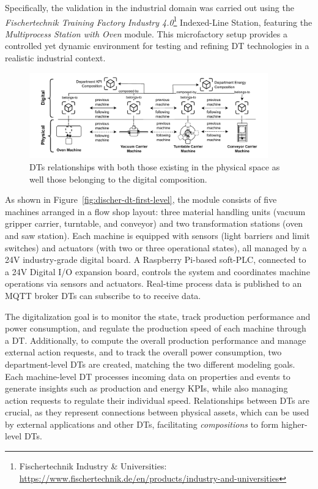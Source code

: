 Specifically, the validation in the industrial domain was carried out using the \emph{Fischertechnik Training Factory Industry 4.0}\footnote{Fischertechnik Industry \& Universities: \url{https://www.fischertechnik.de/en/products/industry-and-universities}} Indexed-Line Station, featuring the \emph{Multiprocess Station with Oven} module.
This microfactory setup provides a controlled yet dynamic environment for testing and refining DT technologies in a realistic industrial context.

\begin{figure}
    \setlength{\belowcaptionskip}{-13pt}
    \centering
    \includegraphics[width=0.92\textwidth]{figures/engineering-wldt/Fischer-relationships.pdf}
    \caption{DTs relationships with both those existing in the physical space as well those belonging to the digital composition.}
    \label{fig:dt-assets-relationships-overview}
\end{figure}

As shown in Figure~\ref{fig:discher-dt-first-level}, the module consists of five machines arranged in a flow shop layout: three material handling units (vacuum gripper carrier, turntable, and conveyor) and two transformation stations (oven and saw station).
Each machine is equipped with sensors (light barriers and limit switches) and actuators (with two or three operational states), all managed by a 24V industry-grade digital board.
A Raspberry Pi-based soft-PLC, connected to a 24V Digital I/O expansion board, controls the system and coordinates machine operations via sensors and actuators. Real-time process data is published to an MQTT broker DTs can subscribe to to receive data.

The digitalization goal is to monitor the state, track production performance and power consumption, and regulate the production speed of each machine through a DT.
Additionally, to compute the overall production performance and manage external action requests, and to track the overall power consumption, two department-level DTs are created, matching the two different modeling goals.
Each machine-level DT processes incoming data on properties and events to generate insights such as production and energy KPIs, while also managing action requests to regulate their individual speed.
Relationships between DTs are crucial, as they represent connections between physical assets, which can be used by external applications and other DTs, facilitating \emph{compositions} to form higher-level DTs.


